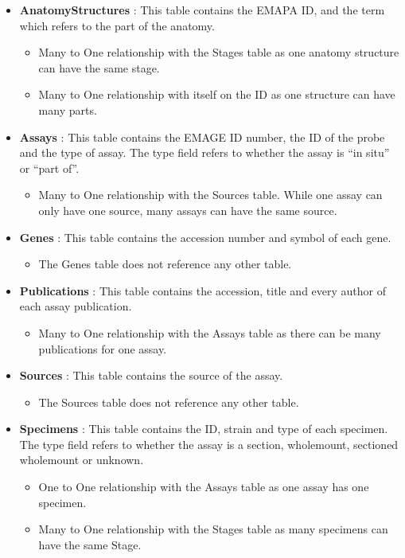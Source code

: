 \begin{itemize}
\item \textbf{AnatomyStructures} : This table contains the EMAPA ID, and the term which refers to the part of the anatomy.
\begin{itemize}
\item Many to One relationship with the Stages table as one anatomy structure can have the same stage.
\item Many to One relationship with itself on the ID as one structure can have many parts.
\end{itemize} 

\item \textbf{Assays} : This table contains the EMAGE ID number, the ID of the probe and the type of assay. The type field refers to whether the assay is ``in situ'' or ``part of''.
\begin{itemize}
\item Many to One relationship with the Sources table. While one assay can only have one source, many assays can have the same source.
\end{itemize} 

\item \textbf{Genes} : This table contains the accession number and symbol of each gene.
\begin{itemize}
\item The Genes table does not reference any other table.
\end{itemize} 

\item \textbf{Publications} : This table contains the accession, title and every author of each assay publication.
\begin{itemize}
\item Many to One relationship with the Assays table as there can be many publications for one assay.
\end{itemize} 

\item \textbf{Sources} : This table contains the source of the assay.
\begin{itemize}
\item The Sources table does not reference any other table.
\end{itemize} 

\item \textbf{Specimens} :  This table contains the ID, strain and type of each specimen. The type field refers to whether the assay is a section, wholemount, sectioned wholemount or unknown.
\begin{itemize}
\item One to One relationship with the Assays table as one assay has one specimen.
\item Many to One relationship with the Stages table as many specimens can have the same Stage.
\end{itemize} 


\end{itemize}

